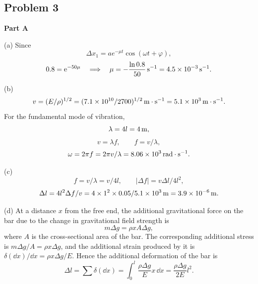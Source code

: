 \subsection*{Problem 3}

\textbf{Part A}

(a) Since
\begin{equation*}
\Delta x_1=ae^{-\mu t}\cos(\omega t+\varphi),
\end{equation*}
\begin{equation*}
0.8=\mathrm{e}^{-50\mu}\quad\Longrightarrow\quad
\mu=-\frac{\ln0.8}{50}\,\mathrm{s^{-1}}=4.5\times10^{-3}\,\mathrm{s^{-1}} .
\end{equation*}

(b)
\begin{equation*}
v=(E/\rho)^{1/2}=(7.1\times10^{10}/2700)^{1/2}\,\mathrm{m\cdot s^{-1}}
=5.1\times10^3\,\mathrm{m\cdot s^{-1}} .
\end{equation*}
For the fundamental mode of vibration,
\begin{equation*}
\lambda=4l=4\,\mathrm{m},
\end{equation*}
\begin{equation*}
v=\lambda f,\qquad f=v/\lambda ,
\end{equation*}
\begin{equation*}
\omega=2\pi f=2\pi v/\lambda=8.06\times10^3\,\mathrm{rad\cdot s^{-1}} .
\end{equation*}

(c)
\begin{equation*}
f=v/\lambda=v/4l,\qquad |\Delta f|=v\Delta l/4l^2 ,
\end{equation*}
\begin{equation*}
\Delta l=4l^2\Delta f/v=4\times1^2\times0.05/5.1\times10^3\,\mathrm{m}
=3.9\times10^{-6}\,\mathrm{m} .
\end{equation*}

(d) At a distance $x$ from the free end, the additional gravitational force on the bar due to the change in gravitational field strength is
\begin{equation*}
m\Delta g=\rho xA\Delta g ,
\end{equation*}
where $A$ is the cross-sectional area of the bar. The corresponding additional stress is $m\Delta g/A=\rho x\Delta g$, and the additional strain produced by it is $\delta(\dd x)/\dd x=\rho x\Delta g/E$. Hence the additional deformation of the bar is
\begin{equation*}
\Delta l=\sum\delta(\dd x)=\int_0^l\frac{\rho\Delta g}{E}x\,\dd x
=\frac{\rho\Delta g}{2E}l^2 .
\end{equation*}

